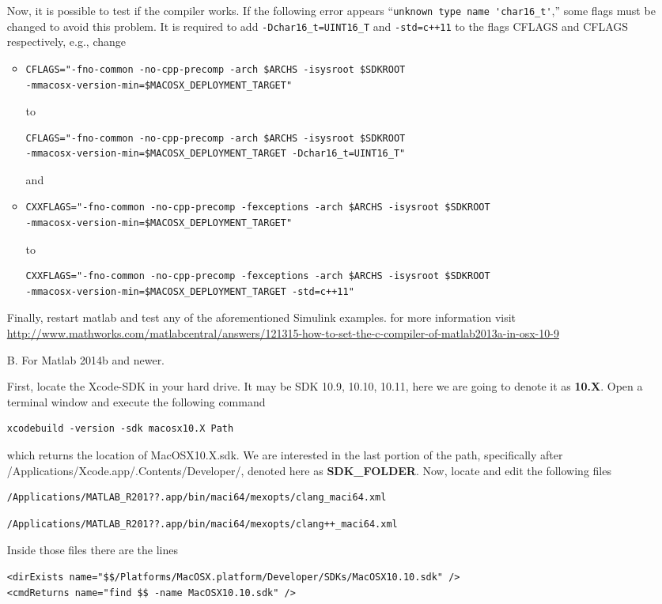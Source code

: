 \documentclass{article}
\begin{document}
\begin{itemize}
Now, it is possible to test if the compiler works. If the following error appears
``\verb!unknown type name 'char16_t'!,'' 
some flags must be changed to avoid this problem. 
It is required to add \verb!-Dchar16_t=UINT16_T! 
and \verb!-std=c++11! to the flags CFLAGS and CFLAGS respectively, e.g., change
\begin{itemize}
\item
\begin{verbatim}
CFLAGS="-fno-common -no-cpp-precomp -arch $ARCHS -isysroot $SDKROOT 
-mmacosx-version-min=$MACOSX_DEPLOYMENT_TARGET"
\end{verbatim}
to
\begin{verbatim}
CFLAGS="-fno-common -no-cpp-precomp -arch $ARCHS -isysroot $SDKROOT 
-mmacosx-version-min=$MACOSX_DEPLOYMENT_TARGET -Dchar16_t=UINT16_T"
\end{verbatim}
and
\item
\begin{verbatim}
CXXFLAGS="-fno-common -no-cpp-precomp -fexceptions -arch $ARCHS -isysroot $SDKROOT 
-mmacosx-version-min=$MACOSX_DEPLOYMENT_TARGET"
\end{verbatim}
to
\begin{verbatim}
CXXFLAGS="-fno-common -no-cpp-precomp -fexceptions -arch $ARCHS -isysroot $SDKROOT 
-mmacosx-version-min=$MACOSX_DEPLOYMENT_TARGET -std=c++11"
\end{verbatim}
\end{itemize}
Finally, restart matlab and test any of the aforementioned Simulink examples.
for more information visit 
{\footnotesize\url{http://www.mathworks.com/matlabcentral/answers/121315-how-to-set-the-c-compiler-of-matlab2013a-in-osx-10-9}}

\item[B.] For Matlab 2014b and newer. 

First, locate the Xcode-SDK in your hard drive. 
It may be SDK 10.9, 10.10, 10.11, here we are going to denote it as \textbf{10.X}. 
Open a terminal window and execute the following command
\begin{verbatim}
xcodebuild -version -sdk macosx10.X Path
\end{verbatim}
which returns the location of MacOSX10.X.sdk. 
We are interested in the last portion of the path, 
specifically after /Applications/Xcode.app/.Contents/Developer/, 
denoted here as \textbf{SDK\_FOLDER}. Now, locate and edit the following files
\begin{verbatim}/Applications/MATLAB_R201??.app/bin/maci64/mexopts/clang_maci64.xml\end{verbatim}
\begin{verbatim}/Applications/MATLAB_R201??.app/bin/maci64/mexopts/clang++_maci64.xml\end{verbatim}
Inside those files there are the lines
\begin{verbatim}
<dirExists name="$$/Platforms/MacOSX.platform/Developer/SDKs/MacOSX10.10.sdk" />
<cmdReturns name="find $$ -name MacOSX10.10.sdk" />
\end{verbatim}


\end{itemize}
\end{document}
